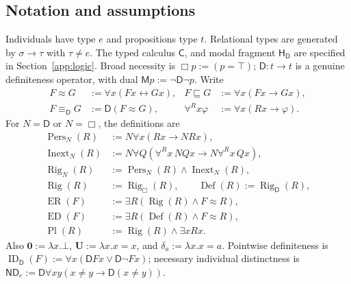 \documentclass[11pt]{article}
\theoremstyle{definition}
\newcommand{\D}{\mathsf D}
\newcommand{\poss}{\mathsf M}
\newcommand{\Rig}{\operatorname{Rig}}
\newcommand{\Pers}{\operatorname{Pers}}
\newcommand{\Inext}{\operatorname{Inext}}
\newcommand{\ED}{\operatorname{ED}}
\newcommand{\Def}{\operatorname{Def}}
\newcommand{\ER}{\operatorname{ER}}
\newcommand{\ID}{\operatorname{ID}}
\newcommand{\Pl}{\operatorname{Pl}}
\newcommand{\C}{\mathsf C}
\newcommand{\HD}{\mathsf H_{\D}}
\newcommand{\U}{\mathbf U}
\newcommand{\Z}{\mathbf 0}
\newcommand{\sng}[1]{\delta_{#1}}
\newcommand{\rel}{\mathbin{\approx}}
\newcommand{\deq}{\mathbin{\equiv_{\D}}}
\newcommand{\sub}{\mathbin{\sqsubseteq}}
\newcommand{\ND}{\mathsf{ND}_e}
\numberwithin{equation}{section}
\begin{document}
\subsection*{Notation and assumptions}
Individuals have type $e$ and propositions type $t$. Relational types are generated by $\sigma\to\tau$ with $\tau\ne e$. The typed calculus $\C$, and modal fragment $\HD$ are specified in Section~\ref{app:logic}. Broad necessity is $\Box p:=(p=\top)$; $\D:t\to t$ is a genuine definiteness operator, with dual $\poss p:=\neg\D\neg p$. Write
\begin{align*}
F\rel G&:=\forall x(Fx\leftrightarrow Gx), &
F\sub G&:=\forall x(Fx\rightarrow Gx),\\
F\deq G&:=\D(F\rel G), &
\forall^R x\varphi&:=\forall x(Rx\rightarrow\varphi).
\end{align*}
For $N=\D$ or $N=\Box$, the definitions are
\begin{align*}
\Pers_N(R)&:=N\forall x(Rx\rightarrow NRx),\\
\Inext_N(R)&:=N\forall Q(\forall^R x\,NQx\rightarrow N\forall^R x\,Qx),\\
\Rig_N(R)&:=\Pers_N(R)\wedge\Inext_N(R),\\
\Rig(R)&:=\Rig_{\Box}(R),\qquad \Def(R):=\Rig_{\D}(R),\\
\ER(F)&:=\exists R(\Rig(R)\wedge F\rel R),\\
\ED(F)&:=\exists R(\Def(R)\wedge F\rel R),\\
\Pl(R)&:=\Rig(R)\wedge\exists xRx.
\end{align*}
Also $\Z:=\lambda x.\bot$, $\U:=\lambda x.x=x$, and $\sng a:=\lambda x.x=a$. Pointwise definiteness is $\ID_\D(F):=\forall x(\D Fx\vee\D\neg Fx)$; necessary individual distinctness is $\ND:=\D\forall xy(x\ne y\rightarrow\D(x\ne y))$.
\end{document}

